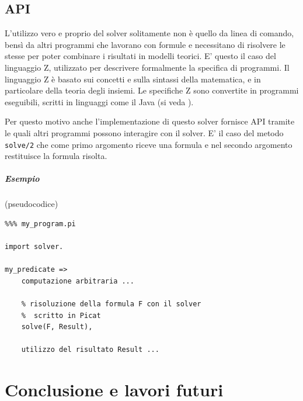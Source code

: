 \documentclass[12pt,a4paper,openright]{book}  %
\begin{document}
\section{API}
\label{sec:use_api}

L'utilizzo vero e proprio del solver solitamente non è quello da linea
di comando, bensì da altri programmi che lavorano con formule e
necessitano di risolvere le stesse per poter combinare i risultati in
modelli teorici. E' questo il caso del linguaggio Z, utilizzato per
descrivere formalmente la specifica di programmi. Il linguaggio Z è
basato sui concetti e sulla sintassi della matematica, e in
particolare della teoria degli insiemi. Le specifiche Z sono
convertite in programmi eseguibili, scritti in linguaggi come il Java
(si veda \cite{DeSantis17}).

Per questo motivo anche l'implementazione di questo solver fornisce
API tramite le quali altri programmi possono interagire con il
solver. E' il caso del metodo \verb|solve/2| che come primo argomento
riceve una formula e nel secondo argomento restituisce la formula
risolta.

\paragraph{Esempio} (pseudocodice)
\begin{verbatim}
%%% my_program.pi

import solver.

my_predicate =>
    computazione arbitraria ...

    % risoluzione della formula F con il solver
    %  scritto in Picat
    solve(F, Result),

    utilizzo del risultato Result ...
\end{verbatim}



\chapter{Conclusione e lavori futuri}
\label{ch:conclusion}
\end{document}
